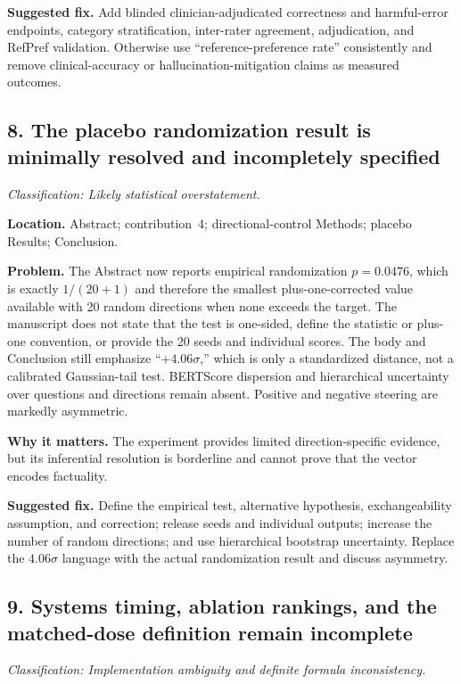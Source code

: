 \documentclass[11pt]{article}
\newcommand{\findinglabel}[1]{\textbf{#1}}
\newcommand{\classification}[1]{\textit{Classification: #1.}}
\begin{document}
\findinglabel{Suggested fix.} Add blinded clinician-adjudicated correctness and harmful-error endpoints, category stratification, inter-rater agreement, adjudication, and RefPref validation.  Otherwise use ``reference-preference rate'' consistently and remove clinical-accuracy or hallucination-mitigation claims as measured outcomes.

\subsection*{8. The placebo randomization result is minimally resolved and incompletely specified}

\classification{Likely statistical overstatement}

\findinglabel{Location.} Abstract; contribution~4; directional-control Methods; placebo Results; Conclusion.

\findinglabel{Problem.} The Abstract now reports empirical randomization $p=0.0476$, which is exactly $1/(20+1)$ and therefore the smallest plus-one-corrected value available with 20 random directions when none exceeds the target.  The manuscript does not state that the test is one-sided, define the statistic or plus-one convention, or provide the 20 seeds and individual scores.  The body and Conclusion still emphasize ``$+4.06\sigma$,'' which is only a standardized distance, not a calibrated Gaussian-tail test.  BERTScore dispersion and hierarchical uncertainty over questions and directions remain absent.  Positive and negative steering are markedly asymmetric.

\findinglabel{Why it matters.} The experiment provides limited direction-specific evidence, but its inferential resolution is borderline and cannot prove that the vector encodes factuality.

\findinglabel{Suggested fix.} Define the empirical test, alternative hypothesis, exchangeability assumption, and correction; release seeds and individual outputs; increase the number of random directions; and use hierarchical bootstrap uncertainty.  Replace the $4.06\sigma$ language with the actual randomization result and discuss asymmetry.

\subsection*{9. Systems timing, ablation rankings, and the matched-dose definition remain incomplete}

\classification{Implementation ambiguity and definite formula inconsistency}
\end{document}
